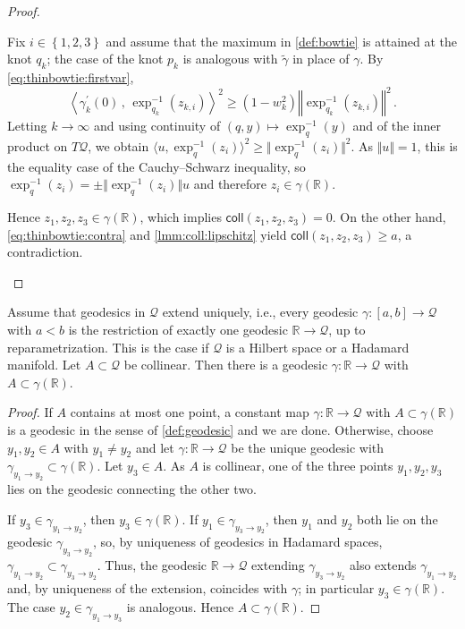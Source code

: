 \documentclass{article}
\newcommand*{\mc}[1]{\mathcal{#1}}
\newcommand*{\ms}[1]{\mathsf{#1}}
\newcommand{\R}{\mathbb{R}}
\newcommand{\lcb}{\left\lbrace} %
\newcommand{\rcb}{\right\rbrace} %
\newcommand{\cb}[1]{\lcb #1 \rcb} %
\newcommand{\normof}[1]{\Vert#1\Vert}
\newcommand{\normOf}[1]{\left\Vert#1\right\Vert}
\newcommand{\ipof}[2]{\langle #1, #2\rangle}
\newcommand{\ipOf}[2]{\left\langle#1\,,\, #2\right\rangle}
\newcommand{\pr}{^\prime}
\newcommand{\eqfs}{\,.}
\newcommand{\geodft}[2]{\gamma_{#1\to#2}} %
\newcommand{\collof}[1]{\ms{coll}(#1)}
\begin{document}
\begin{proof}
\begin{enumerate}[label=(\roman*)]
        Fix $i\in\cb{1,2,3}$ and assume that the maximum in \cref{def:bowtie} is attained at the knot $q_k$; the case of the knot $p_k$ is analogous with $\tilde\gamma$ in place of $\gamma$. By \eqref{eq:thinbowtie:firstvar},
        \begin{equation}
            \ipOf{\gamma_k\pr(0)}{\exp^{-1}_{q_k}(z_{k,i})}^2 \geq (1-w_k^2) \normOf{\exp^{-1}_{q_k}(z_{k,i})}^2
            \eqfs
        \end{equation}
        Letting $k\to\infty$ and using continuity of $(q,y)\mapsto \exp^{-1}_q(y)$ and of the inner product on $T\mc Q$, we obtain $\ipof{u}{\exp^{-1}_q(z_i)}^2 \geq \normof{\exp^{-1}_q(z_i)}^2$. As $\normof u = 1$, this is the equality case of the Cauchy--Schwarz inequality, so $\exp^{-1}_q(z_i) = \pm\normof{\exp^{-1}_q(z_i)} u$ and therefore $z_i \in\gamma(\R)$.
        
        Hence $z_1,z_2,z_3\in\gamma(\R)$, which implies $\collof{z_1,z_2,z_3} = 0$. On the other hand, \eqref{eq:thinbowtie:contra} and \cref{lmm:coll:lipschitz} yield $\collof{z_1,z_2,z_3}\geq a$, a contradiction.
        \qedhere
    \end{enumerate}
\end{proof}
%
\begin{lemma}\label{lmm:collinearset}
    Assume that geodesics in $\mc Q$ extend uniquely, i.e., every geodesic $\gamma\colon[a,b]\to\mc Q$ with $a<b$ is the restriction of exactly one geodesic $\R\to\mc Q$, up to reparametrization. This is the case if $\mc Q$ is a Hilbert space or a Hadamard manifold. Let $A\subset\mc Q$ be collinear. Then there is a geodesic $\gamma\colon\R\to\mc Q$ with $A\subset\gamma(\R)$.
\end{lemma}
%
\begin{proof}
    If $A$ contains at most one point, a constant map $\gamma\colon\R\to\mc Q$ with $A\subset\gamma(\R)$ is a geodesic in the sense of \cref{def:geodesic} and we are done. Otherwise, choose $y_1,y_2\in A$ with $y_1\neq y_2$ and let $\gamma\colon\R\to\mc Q$ be the unique geodesic with $\geodft{y_1}{y_2}\subset\gamma(\R)$. Let $y_3\in A$. As $A$ is collinear, one of the three points $y_1,y_2,y_3$ lies on the geodesic connecting the other two.
    
    If $y_3\in\geodft{y_1}{y_2}$, then $y_3\in\gamma(\R)$. If $y_1\in\geodft{y_3}{y_2}$, then $y_1$ and $y_2$ both lie on the geodesic $\geodft{y_3}{y_2}$, so, by uniqueness of geodesics in Hadamard spaces, $\geodft{y_1}{y_2}\subset\geodft{y_3}{y_2}$. Thus, the geodesic $\R\to\mc Q$ extending $\geodft{y_3}{y_2}$ also extends $\geodft{y_1}{y_2}$ and, by uniqueness of the extension, coincides with $\gamma$; in particular $y_3\in\gamma(\R)$. The case $y_2\in\geodft{y_1}{y_3}$ is analogous. Hence $A\subset\gamma(\R)$.
\end{proof}
\end{document}
